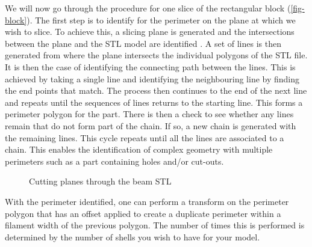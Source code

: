 We will now go through the procedure for one slice of the rectangular block (\cref{fig-block}). The first step is to identify for the perimeter on the plane at which we wish to slice. To achieve this, a slicing plane is generated and the intersections between the plane and the \ac{STL} model are identified .
A set of lines is then generated from where the plane intersects the individual polygons of the \ac{STL} file. It is then the case of identifying the connecting path between the lines. This is achieved by taking a single line and identifying the neighbouring line by finding the end points that match. The process then continues to the end of the next line and repeats until the sequences of lines returns to the starting line. This forms a perimeter polygon for the part. There is then a check to see whether any lines remain that do not form part of the chain. If so, a new chain is generated with the remaining lines. This cycle repeats until all the lines are associated to a chain. This enables the identification of complex geometry with multiple perimeters such as a part containing holes and/or cut-outs.

\begin{figure}[h!]
  \center
  \caption{Cutting planes through the beam STL}
  \label{fig-intersection}
\end{figure}


With the perimeter identified, one can perform a transform on the perimeter polygon that has an offset applied to create a duplicate perimeter within a filament width of the previous polygon. The number of times this is performed is determined by the number of shells you wish to have for your model.



